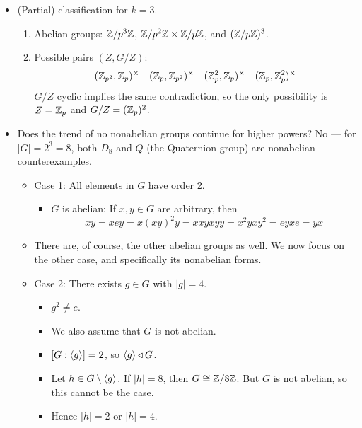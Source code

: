 \documentclass[../notes.tex]{subfiles}
\begin{document}
\begin{itemize}
\begin{enumerate}
    \end{enumerate}
    \item (Partial) classification for $k=3$.
    \begin{enumerate}
        \item Abelian groups: $\mathbb{Z}/p^3\mathbb{Z}$, $\mathbb{Z}/p^2\mathbb{Z}\times\mathbb{Z}/p\mathbb{Z}$, and $(\mathbb{Z}/p\mathbb{Z})^3$.
        \item Possible pairs $(Z,G/Z)$:
        \begin{align*}
            (\mathbb{Z}_{p^2},\mathbb{Z}_p)^\times&&
            (\mathbb{Z}_p,\mathbb{Z}_{p^2})^\times&&
            (\mathbb{Z}_p^2,\mathbb{Z}_p)^\times&&
            (\mathbb{Z}_p,\mathbb{Z}_p^2)^\times
        \end{align*}
        $G/Z$ cyclic implies the same contradiction, so the only possibility is $Z=\mathbb{Z}_p$ and $G/Z=(\mathbb{Z}_p)^2$.
    \end{enumerate}
    \item Does the trend of no nonabelian groups continue for higher powers? No --- for $|G|=2^3=8$, both $D_8$ and $Q$ (the Quaternion group) are nonabelian counterexamples.
    \begin{itemize}
        \item Case 1: All elements in $G$ have order 2.
        \begin{itemize}
            \item $G$ is abelian: If $x,y\in G$ are arbitrary, then
            \begin{equation*}
                xy = xey
                = x(xy)^2y
                = xxyxyy
                = x^2yxy^2
                = eyxe
                = yx
            \end{equation*}
        \end{itemize}
        \item There are, of course, the other abelian groups as well. We now focus on the other case, and specifically its nonabelian forms.
        \item Case 2: There exists $g\in G$ with $|g|=4$.
        \begin{itemize}
            \item $g^2\neq e$.
            \item We also assume that $G$ is not abelian.
            \item $[G:\left\langle{g}\right\rangle]=2$, so $\left\langle{g}\right\rangle\triangleleft G$.
            \item Let $h\in G\setminus\left\langle{g}\right\rangle$. If $|h|=8$, then $G\cong\mathbb{Z}/8\mathbb{Z}$. But $G$ is not abelian, so this cannot be the case.
            \item Hence $|h|=2$ or $|h|=4$.

\end{itemize}
\end{itemize}
\end{itemize}
\end{document}
